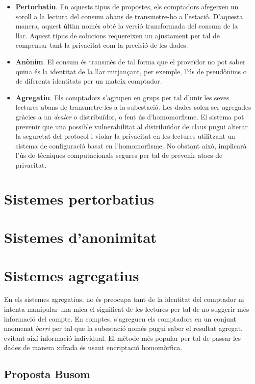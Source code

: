 \documentclass{article}
\begin{document}
\begin{itemize}
	\item \textbf{Pertorbatiu}. En aquests tipus de propostes, els comptadors afegeixen un soroll a la lectura del consum abans de transmetre-ho a l'estació. D'aquesta manera, aquest últim només obté la versió transformada del consum de la llar. Aquest tipus de solucions requereixen un ajustament per tal de compensar tant la privacitat com la precisió de les dades.
	\item \textbf{Anònim}. El consum és transmès de tal forma que el proveïdor no pot saber quina és la identitat de la llar mitjançant, per exemple, l'ús de pseudònims o de diferents identitats per un mateix comptador.
	\item \textbf{Agregatiu}. Els comptadors s'agrupen en grups per tal d'unir les seves lectures abans de transmetre-les a la subestació. Les dades solen ser agregades gràcies a un \textit{dealer} o distribuïdor, o fent ús d'homomorfisme. El sistema pot prevenir que una possible vulnerabilitat al distribuïdor de claus pugui alterar la seguretat del protocol i violar la privacitat en les lectures utilitzant un sistema de configuració basat en l'homomorfisme. No obstant això, implicarà l'ús de tècniques computacionals segures per tal de prevenir atacs de privacitat.
\end{itemize}
\section{Sistemes pertorbatius}

\section{Sistemes d'anonimitat}

\section{Sistemes agregatius}
En els sistemes agregatius, no és preocupa tant de la identitat del comptador ni intenta manipular una mica el significat de les lectures per tal de no suggerir més informació del compte. En comptes, s'agreguen els comptadors en un conjunt anomenat \textit{barri} per tal que la subestació només pugui saber el resultat agregat, evitant així informació individual. El mètode més popular per tal de passar les dades de manera xifrada és usant encriptació homomòrfica. 
\subsection{Proposta Busom}

\end{document}

